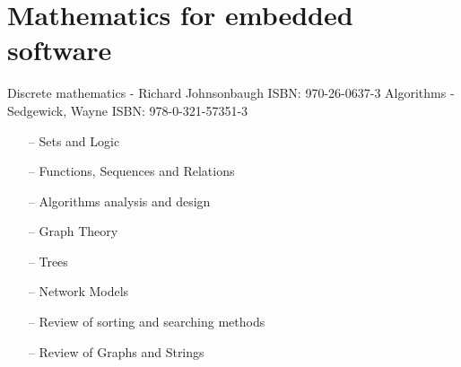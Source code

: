 \documentclass{article}
\begin{document}
\section{Mathematics for embedded software}
    Discrete mathematics - Richard Johnsonbaugh ISBN: 970-26-0637-3
    Algorithms - Sedgewick, Wayne ISBN: 978-0-321-57351-3
    \begin{itemize}
     \setlength\itemsep{0pt}
        \item[--] Sets and Logic
        \item[--] Functions, Sequences and Relations
        \item[--] Algorithms analysis and design
        \item[--] Graph Theory
        \item[--] Trees
        \item[--] Network Models
        \item[--] Review of sorting and searching methods
        \item[--] Review of Graphs and Strings
    \end{itemize}
\end{document}
